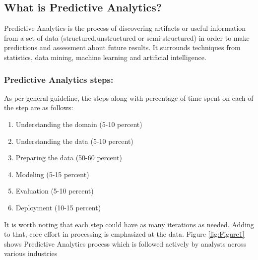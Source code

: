 \documentclass[runningheads]{llncs}
\begin{document}
\subsection{What is Predictive Analytics?}
Predictive Analytics is the process of discovering artifacts or useful information from a set of data (structured,unstructured or semi-structured) in order to make predictions and assessment about future results.
It surrounds techniques from statistics, data mining, machine learning and artificial intelligence.\vspace{-2mm}

\subsubsection{Predictive Analytics steps:}As per general guideline, the steps along with percentage of time spent on each of the step are as follows: \newline
\begin{enumerate}
	\item Understanding the domain (5-10 percent)
	\item Understanding the data (5-10 percent)
	\item Preparing the data (50-60 percent)
	\item Modeling (5-15 percent)
	\item Evaluation (5-10 percent)
	\item Deployment (10-15 percent)
\end{enumerate} 
It is worth noting that each step could have as many iterations as needed. Adding to that, core effort in processing is emphasized at the data.\newline
Figure \ref{fig:Figure1} shows Predictive Analytics process which is followed actively by analysts across various industries \cite{6}
\end{document}
